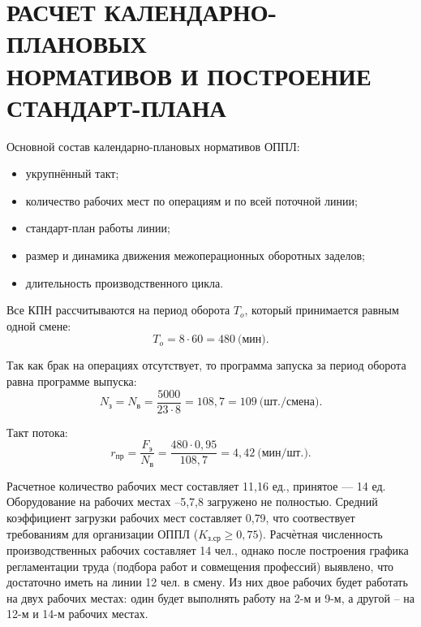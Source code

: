 \section[
Расчет календарно-плановых нормативов и построение стандарт-плана]{
РАСЧЕТ КАЛЕНДАРНО-ПЛАНОВЫХ \\ 
НОРМАТИВОВ И ПОСТРОЕНИЕ \\
СТАНДАРТ-ПЛАНА
}
\label{sec:kpn}

Основной состав календарно-плановых нормативов ОППЛ:
\begin{itemize}
\item укрупнённый такт;
\item количество рабочих мест по операциям и по всей поточной линии;
\item стандарт-план работы линии;
\item размер и динамика движения межоперационных оборотных заделов; 
\item длительность производственного цикла.
\end{itemize}

Все КПН рассчитываются на период оборота \( T_{o} \), который принимается равным
одной смене:
\begin{equation*}
  T_{o} = 8 \cdot 60 = 480 \: \text{(мин)}.
\end{equation*}

Так как брак на операциях отсутствует, 
то программа запуска за период оборота равна программе выпуска:
\begin{equation*}
  N_{\text{з}} = N_{\text{в}} = 
  \dfrac{5000}{23 \cdot 8} = 108{,}7 = 109 \: \text{(шт./смена)}.
\end{equation*}

Такт потока:
\begin{equation*}
  r_{\text{пр}} = \dfrac{F_{\text{э}}}{N_{\text{в}}} = 
  \dfrac{480 \cdot 0{,}95}{108{,}7} = 4{,}42 \: \text{(мин/шт.)}.
\end{equation*}

Расчетное количество рабочих мест составляет 11{,}16 ед.,
принятое --- 14 ед.
Оборудование на рабочих местах \textnumero {}--5,7,8 
загружено не полностью.
Средний коэффициент загрузки рабочих мест составляет 0{,}79, что соотвествует
требованиям для организации ОППЛ (\( K_{\text{з.ср}} \ge 0{,}75 \)).
Расчѐтная численность производственных рабочих составляет 14 чел.,
однако после построения графика регламентации труда
(подбора работ и совмещения профессий) выявлено, что достаточно
иметь на линии 12 чел. в смену.
Из них двое рабочих будет работать на двух рабочих местах:
один будет выполнять работу на 2-м и 9-м, а другой – на 12-м и
14-м рабочих местах.

